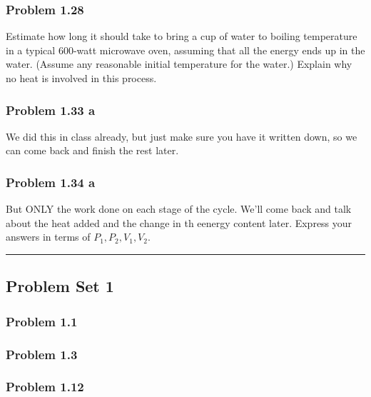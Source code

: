 \documentclass[11pt]{article}
\begin{document}
\subsubsection{Problem 1.28}\label{problem-1.28}

Estimate how long it should take to bring a cup of water to boiling
temperature in a typical 600-watt microwave oven, assuming that all the
energy ends up in the water. (Assume any reasonable initial temperature
for the water.) Explain why no heat is involved in this process.

\subsubsection{Problem 1.33 a}\label{problem-1.33-a}

We did this in class already, but just make sure you have it written
down, so we can come back and finish the rest later.

\subsubsection{Problem 1.34 a}\label{problem-1.34-a}

But ONLY the work done on each stage of the cycle. We'll come back and
talk about the heat added and the change in th eenergy content later.
Express your answers in terms of \(P_1, P_2, V_1, V_2.\)

\begin{center}\rule{0.5\linewidth}{0.5pt}\end{center}

    \subsection{Problem Set 1}\label{problem-set-1}

\subsubsection{Problem 1.1}\label{problem-1.1}

\subsubsection{Problem 1.3}\label{problem-1.3}

\subsubsection{Problem 1.12}\label{problem-1.12}
\end{document}
